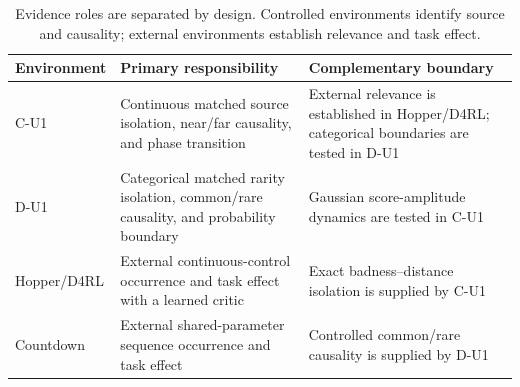 \begin{table}[t]
\centering
\caption{Evidence roles are separated by design. Controlled environments identify source and causality; external environments establish relevance and task effect.}
\label{tab:environment_roles}
\small
\begin{tabular}{p{}p{}p{}}
\toprule
Environment & Primary responsibility & Complementary boundary \\
\midrule
C-U1 & Continuous matched source isolation, near/far causality, and phase transition & External relevance is established in Hopper/D4RL; categorical boundaries are tested in D-U1 \\
D-U1 & Categorical matched rarity isolation, common/rare causality, and probability boundary & Gaussian score-amplitude dynamics are tested in C-U1 \\
Hopper/D4RL & External continuous-control occurrence and task effect with a learned critic & Exact badness--distance isolation is supplied by C-U1 \\
Countdown & External shared-parameter sequence occurrence and task effect & Controlled common/rare causality is supplied by D-U1 \\
\bottomrule
\end{tabular}
\end{table}
